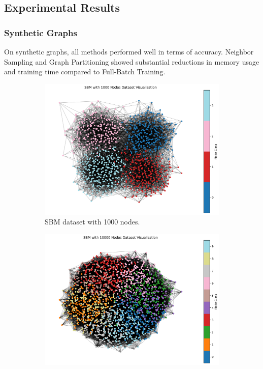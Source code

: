 \documentclass{article}
\begin{document}
\subsection{Experimental Results}
\subsubsection{Synthetic Graphs}
On synthetic graphs, all methods performed well in terms of accuracy. Neighbor Sampling and Graph Partitioning showed substantial reductions in memory usage and training time compared to Full-Batch Training.

\begin{figure}[H]
    \centering
    \begin{subfigure}[b]{0.48\textwidth}
        \centering
        \includegraphics[width=\textwidth]{SBM_with_1000_Nodes_graph.png}
        \caption{SBM dataset with 1000 nodes.}
        \label{fig:sbm_1000}
    \end{subfigure}
    \hfill
    \begin{subfigure}[b]{0.48\textwidth}
        \centering
        \includegraphics[width=\textwidth]{SBM_with_10000_Nodes_graph.png}

\end{subfigure}
\end{figure}
\end{document}
